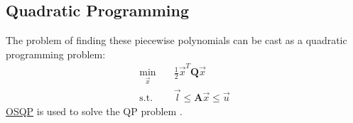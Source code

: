 \documentclass[12pt]{article}
\begin{document}
\subsection{Quadratic Programming}
The problem of finding these piecewise polynomials can be cast as a quadratic
programming problem:
%
\begin{equation}
  \begin{split}
    \min_{\vec{x}} \quad& \frac{1}{2} \vec{x}^T \mathbf{Q} \vec{x}  \\
    \text{s.t.} \quad& \vec{l} \leq \mathbf{A} \vec{x} \leq \vec{u}
  \end{split}
\end{equation}
%
\href{https://osqp.org}{OSQP} is used to solve the QP problem \cite{osqp}.



\end{document}
